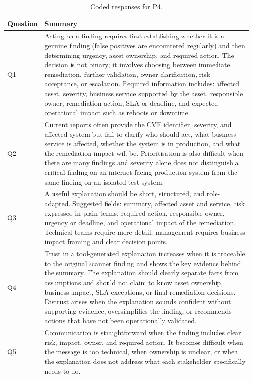 \begin{table}[h]
\centering
\begin{tabular}{@{}lp{}@{}}
\toprule
\textbf{Question} & \textbf{Summary} \\
\midrule
Q1 & Acting on a finding requires first establishing whether it is a genuine finding (false positives are encountered regularly) and then determining urgency, asset ownership, and required action. The decision is not binary; it involves choosing between immediate remediation, further validation, owner clarification, risk acceptance, or escalation. Required information includes: affected asset, severity, business service supported by the asset, responsible owner, remediation action, SLA or deadline, and expected operational impact such as reboots or downtime. \\
\midrule
Q2 & Current reports often provide the \ac{CVE} identifier, severity, and affected system but fail to clarify who should act, what business service is affected, whether the system is in production, and what the remediation impact will be. Prioritisation is also difficult when there are many findings and severity alone does not distinguish a critical finding on an internet-facing production system from the same finding on an isolated test system. \\
\midrule
Q3 & A useful explanation should be short, structured, and role-adapted. Suggested fields: summary, affected asset and service, risk expressed in plain terms, required action, responsible owner, urgency or deadline, and operational impact of the remediation. Technical teams require more detail; management requires business impact framing and clear decision points. \\
\midrule
Q4 & Trust in a tool-generated explanation increases when it is traceable to the original scanner finding and shows the key evidence behind the summary. The explanation should clearly separate facts from assumptions and should not claim to know asset ownership, business impact, SLA exceptions, or final remediation decisions. Distrust arises when the explanation sounds confident without supporting evidence, oversimplifies the finding, or recommends actions that have not been operationally validated. \\
\midrule
Q5 & Communication is straightforward when the finding includes clear risk, impact, owner, and required action. It becomes difficult when the message is too technical, when ownership is unclear, or when the explanation does not address what each stakeholder specifically needs to do. \\
\bottomrule
\end{tabular}
\caption{Coded responses for P4.}
\label{tab:p4-responses}
\end{table}

